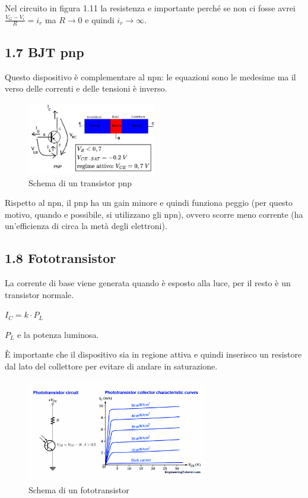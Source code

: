 \documentclass[
]{article}
\begin{document}
Nel circuito in figura 1.11 la resistenza e importante perché se non ci
fosse avrei \(\frac{V_{G}-V_{i}}{R}=i_{r}\) ma \(R\to 0\) e quindi
\(i_{r}\to\infty\).

\subsection{1.7 BJT pnp}\label{bjt-pnp}

Questo dispositivo è complementare al npn: le equazioni sono le medesime
ma il verso delle correnti e delle tensioni è inverso.

\begin{figure}
\centering
\includegraphics[width=0.5\textwidth,height=\textheight]{immagini/12.png}
\caption{Schema di un transistor pnp}
\end{figure}

Rispetto al npn, il pnp ha un gain minore e quindi funziona peggio (per
questo motivo, quando e possibile, si utilizzano gli npn), ovvero scorre
meno corrente (ha un'efficienza di circa la metà degli elettroni).

\subsection{1.8 Fototransistor}\label{fototransistor}

La corrente di base viene generata quando è esposto alla luce, per il
resto è un transistor normale.

\(I_{C}=k\cdot P_{L}\)

\(P_{L}\) e la potenza luminosa.

È importante che il dispositivo sia in regione attiva e quindi inserisco
un resistore dal lato del collettore per evitare di andare in
saturazione.

\begin{figure}
\centering
\includegraphics[width=0.7\textwidth,height=\textheight]{immagini/13.png}
\caption{Schema di un fototransistor}
\end{figure}
\end{document}
